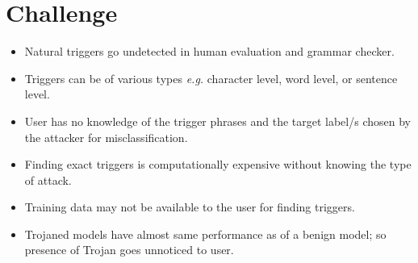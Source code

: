 \section{Challenge}\label{sec:chal}
\begin{frame}{}
\justifying

\begin{itemize}
    \item Natural triggers go undetected in human evaluation and grammar checker.
    \item Triggers can be of various types \textit{e.g.} character level, word level, or sentence level.
    \item User has no knowledge of the trigger phrases and the target label/s chosen by the attacker for misclassification.
    \item Finding exact triggers is computationally expensive without knowing the type of attack.
    \item Training data may not be available to the user for finding triggers.
    \item Trojaned models have almost same performance as of a benign model; so presence of Trojan goes unnoticed to user.
\end{itemize}

\end{frame}